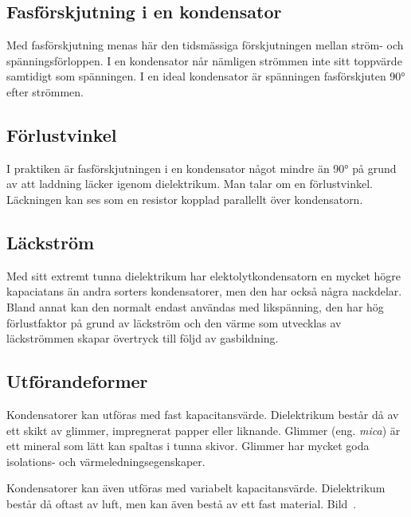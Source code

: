 \subsection{Fasförskjutning i en kondensator}

Med fasförskjutning menas här den tidsmässiga förskjutningen mellan ström- och
spänningsförloppen.
I en kondensator når nämligen strömmen inte sitt toppvärde samtidigt som
spänningen.
I en ideal kondensator är spänningen fasförskjuten \ang{90} efter strömmen.

\subsection{Förlustvinkel}

I praktiken är fasförskjutningen i en kondensator något mindre än \ang{90} på
grund av att laddning läcker igenom dielektrikum.
Man talar om en förlustvinkel.
Läckningen kan ses som en resistor kopplad parallellt över kondensatorn.

\subsection{Läckström}

Med sitt extremt tunna dielektrikum har elektolytkondensatorn en mycket högre
kapaciatans än andra sorters kondensatorer, men den har också några nackdelar.
Bland annat kan den normalt endast användas med likspänning, den har hög 
förlustfaktor på grund av läckström och den värme som utvecklas av läckströmmen 
skapar övertryck till följd av gasbildning.

\subsection{Utförandeformer}

Kondensatorer kan utföras med fast kapacitansvärde.
Dielektrikum består då av ett skikt av glimmer, impregnerat papper eller liknande.
Glimmer (eng. \emph{mica}) är ett mineral som lätt kan spaltas i tunna skivor.
Glimmer har mycket goda isolations- och värmeledningsegenskaper.

Kondensatorer kan även utföras med variabelt kapacitansvärde.
Dielektrikum består då oftast av luft, men kan även bestå av ett fast material.
Bild~.

